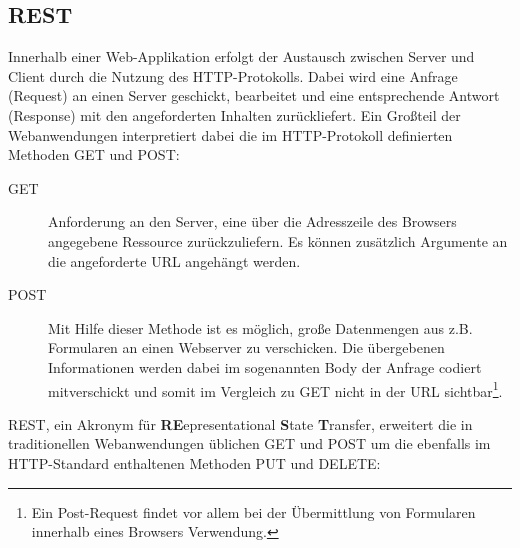 \subsection{REST}
Innerhalb einer Web-Applikation erfolgt der Austausch zwischen Server und Client durch die Nutzung des HTTP-Protokolls. Dabei wird eine Anfrage (Request) an einen Server geschickt, bearbeitet und eine entsprechende Antwort (Response) mit den angeforderten Inhalten zurückliefert. Ein Großteil der Webanwendungen interpretiert dabei die im HTTP-Protokoll definierten Methoden GET und POST:

\begin{description}
\item[GET]
	Anforderung an den Server, eine über die Adresszeile des Browsers angegebene Ressource zurückzuliefern. Es können zusätzlich Argumente an die angeforderte URL angehängt werden.
\item[POST]
	Mit Hilfe dieser Methode ist es möglich,  große Datenmengen aus z.B. Formularen an einen Webserver zu verschicken. Die übergebenen Informationen werden dabei im sogenannten Body der Anfrage codiert mitverschickt und somit im Vergleich zu GET nicht in der URL sichtbar\footnote{Ein Post-Request findet vor allem bei der Übermittlung von Formularen innerhalb eines Browsers Verwendung.}.
\end{description}


REST, ein Akronym für \textbf{RE}epresentational \textbf{S}tate \textbf{T}ransfer, erweitert die in  traditionellen Webanwendungen üblichen GET und POST um die ebenfalls im HTTP-Standard enthaltenen Methoden PUT und DELETE:

